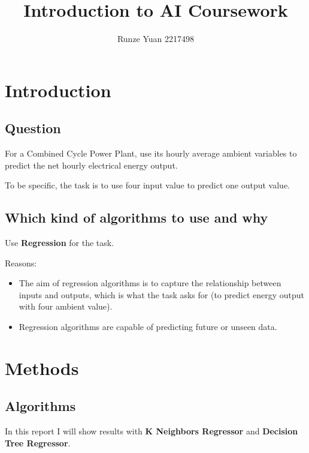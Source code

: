 \documentclass[a4paper]{article}
\title{Introduction to AI Coursework}
\author{Runze Yuan 2217498}
\begin{document}
\maketitle

\section{Introduction}

\subsection{Question}

For a Combined Cycle Power Plant, use its hourly average ambient variables to predict the net hourly electrical energy output.

To be specific, the task is to use four input value to predict one output value.

\subsection{Which kind of algorithms to use and why}

Use \textbf{Regression} for the task.

\vspace{5pt}

Reasons:
\begin{itemize}
    \item The aim of regression algorithms is to capture the relationship between inputs and outputs, which is what the task asks for (to predict energy output with four ambient value).
    \item Regression algorithms are capable of predicting future or unseen data.
\end{itemize}

\section{Methods}

\subsection{Algorithms}

In this report I will show results with \textbf{K Neighbors Regressor} and \textbf{Decision Tree Regressor}.
\end{document}
